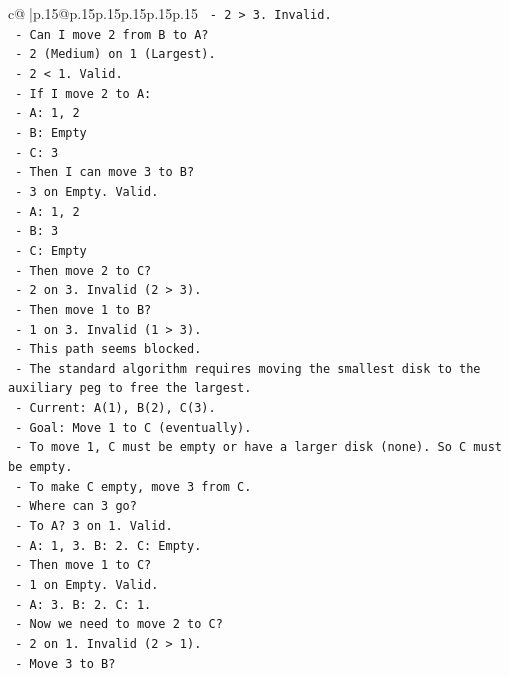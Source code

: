 \documentclass{article}
\begin{document}
{\begin{supertabular}{c@{$\;$}|p{.15\linewidth}@{}p{.15\linewidth}p{.15\linewidth}p{.15\linewidth}p{.15\linewidth}p{.15\linewidth}}
{{{\texttt{  {-} 2 > 3. Invalid.} \\
\texttt{  {-} Can I move 2 from B to A?} \\
\texttt{  {-} 2 (Medium) on 1 (Largest).} \\
\texttt{  {-} 2 < 1. Valid.} \\
\texttt{  {-} If I move 2 to A:} \\
\texttt{    {-} A: 1, 2} \\
\texttt{    {-} B: Empty} \\
\texttt{    {-} C: 3} \\
\texttt{  {-} Then I can move 3 to B?} \\
\texttt{    {-} 3 on Empty. Valid.} \\
\texttt{    {-} A: 1, 2} \\
\texttt{    {-} B: 3} \\
\texttt{    {-} C: Empty} \\
\texttt{  {-} Then move 2 to C?} \\
\texttt{    {-} 2 on 3. Invalid (2 > 3).} \\
\texttt{  {-} Then move 1 to B?} \\
\texttt{    {-} 1 on 3. Invalid (1 > 3).} \\
\texttt{  {-} This path seems blocked.} \\
\texttt{  {-} The standard algorithm requires moving the smallest disk to the auxiliary peg to free the largest.} \\
\texttt{  {-} Current: A(1), B(2), C(3).} \\
\texttt{  {-} Goal: Move 1 to C (eventually).} \\
\texttt{  {-} To move 1, C must be empty or have a larger disk (none). So C must be empty.} \\
\texttt{  {-} To make C empty, move 3 from C.} \\
\texttt{  {-} Where can 3 go?} \\
\texttt{  {-} To A? 3 on 1. Valid.} \\
\texttt{    {-} A: 1, 3. B: 2. C: Empty.} \\
\texttt{    {-} Then move 1 to C?} \\
\texttt{    {-} 1 on Empty. Valid.} \\
\texttt{    {-} A: 3. B: 2. C: 1.} \\
\texttt{    {-} Now we need to move 2 to C?} \\
\texttt{    {-} 2 on 1. Invalid (2 > 1).} \\
\texttt{    {-} Move 3 to B?} \\
}}}
\end{supertabular}}
\end{document}
